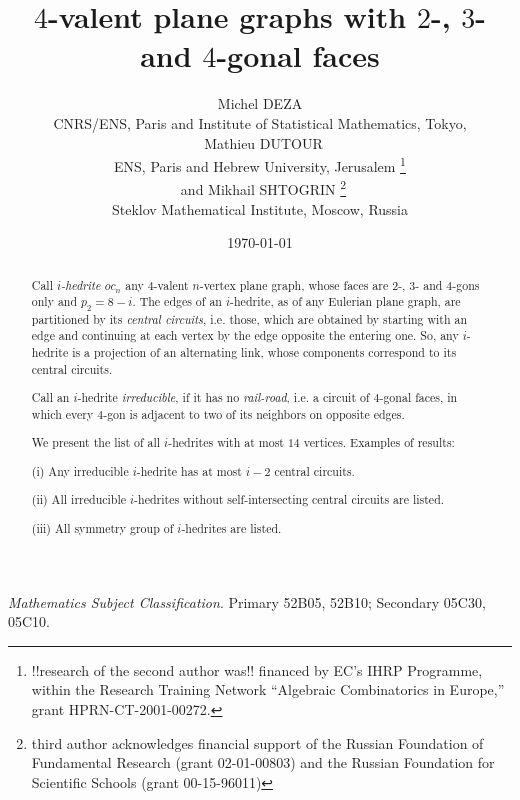 \documentclass[12pt]{article}
\begin{document}
\title{$4$-valent plane graphs with $2$-, $3$- and $4$-gonal faces}


\author{Michel DEZA \\
  CNRS/ENS, Paris and Institute of Statistical Mathematics, 
Tokyo,\\
\ Mathieu DUTOUR \\
 ENS, Paris and Hebrew University, Jerusalem
\footnote{!!research of the second author was!! financed by EC's IHRP Programme, within the Research Training Network ``Algebraic Combinatorics in Europe,'' grant HPRN-CT-2001-00272.}\\
\ and  Mikhail SHTOGRIN \thanks{third author acknowledges financial support 
of the Russian Foundation of Fundamental Research (grant 02-01-00803)
and the Russian Foundation for Scientific Schools (grant 00-15-96011)}\\
Steklov Mathematical Institute, Moscow, Russia} 
\date{\today}

\maketitle



\begin{abstract}
Call {\em $i$-hedrite $oc_n$} any $4$-valent $n$-vertex plane graph, whose 
faces are $2$-, $3$- and $4$-gons only and $p_2=8-i$. The edges of an $i$-hedrite, as of 
any Eulerian plane graph, are partitioned
by its {\em central circuits}, i.e. those, which are obtained by starting with an
edge and continuing at each vertex by the edge opposite the entering one. 
So, any $i$-hedrite is a projection of an alternating link, whose components
correspond to its central circuits.

Call an $i$-hedrite {\em irreducible}, if it has no 
{\em rail-road}, i.e. a 
circuit of $4$-gonal faces, in which every $4$-gon is adjacent to two of its 
neighbors on opposite edges.

We present the list of all $i$-hedrites with at most $14$ vertices. Examples of results: 

(i) Any irreducible $i$-hedrite has at most $i-2$ central circuits.

(ii) All irreducible $i$-hedrites without self-intersecting central circuits are listed.

(iii) All symmetry group of $i$-hedrites are listed.

\end{abstract}

{\em Mathematics Subject Classification}. Primary 52B05, 52B10;
Secondary 05C30, 05C10.
\end{document}
